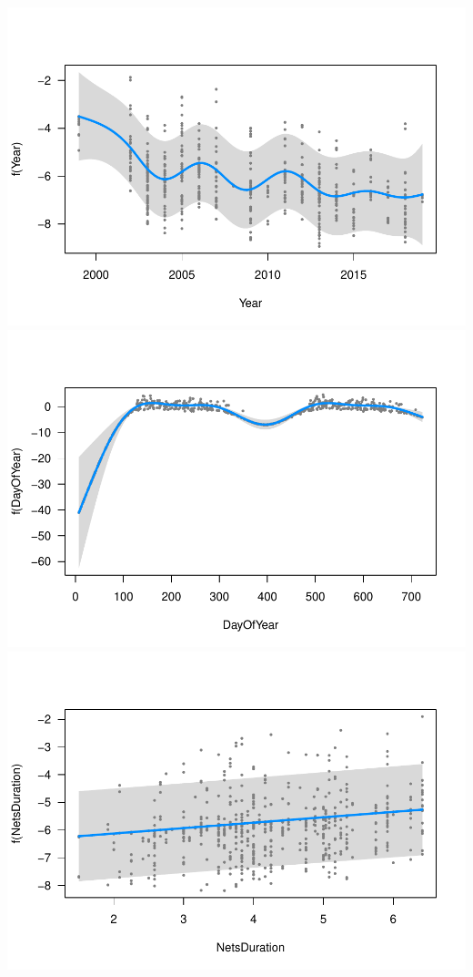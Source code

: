 \documentclass[]{interact}
\theoremstyle{plain}%
\theoremstyle{definition}
\theoremstyle{remark}
\begin{document}
\includegraphics{manuscript_files/figure-latex/unnamed-chunk-11-1.pdf}
\includegraphics{manuscript_files/figure-latex/unnamed-chunk-11-2.pdf}
\includegraphics{manuscript_files/figure-latex/unnamed-chunk-11-3.pdf}
\end{document}
